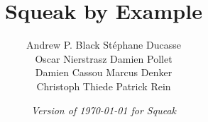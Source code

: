 \documentclass[a4paper,10pt,twoside]{book}
\begin{document}

\frontmatter
\setcounter{page}{1}
\pagestyle{headings}
\author{
	Andrew P. Black\quad
	St\'ephane Ducasse\\[1ex]
	Oscar Nierstrasz\quad
	Damien Pollet\\[1ex]
	Damien Cassou\quad
	Marcus Denker\\[1ex]
	Christoph Thiede\quad
	Patrick Rein}
\title{\Huge\bf Squeak by Example}
\isodate
\date{\emph{Version of \today {\ifdefined\SQUEAKVERSION
	\space{}for Squeak \SQUEAKVERSION%
	\else\fi}%
}}
\maketitle
~ %
\vfill
\end{document}
